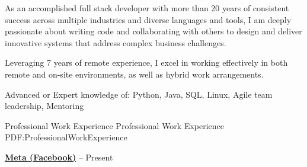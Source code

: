 \documentclass[letterpaper,MMMMyyyy,nonstopmode]{simpleresumecv}
\begin{document}
\begin{Body}




As an accomplished full stack developer with more than 20 years of consistent success across multiple industries and diverse languages and tools, I am deeply passionate about writing code and collaborating with others to design and deliver innovative systems that address complex business challenges. 

Leveraging 7 years of remote experience, I excel in working effectively in both remote and on-site environments, as well as hybrid work arrangements.


\iffalse
\Entry
Full Stack/Backend Java architect, developer, and consultant, specializing in Java/Oracle/JavaScript
solutions and integrations.
\fi
\Gap
Advanced or Expert knowledge of: Python, Java, SQL, Linux, Agile team leadership, Mentoring


\Section
{Professional\newline
Work Experience}
{Professional Work Experience}
{PDF:ProfessionalWorkExperience}

\Entry
\href{https://engineering.fb.com/category/production-engineering/}
{\textbf{Meta (Facebook)}}
\hfill
{} --
Present


\end{Body}
\end{document}
